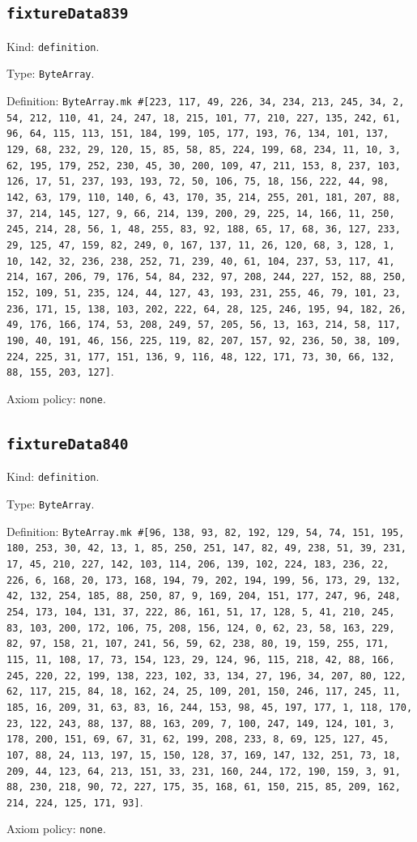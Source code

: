 \documentclass[11pt]{article}
\begin{document}
\subsection*{\texttt{fixtureData839}}
\noindent Kind: \texttt{definition}.\par
\noindent Type: \texttt{ByteArray}.\par
\noindent Definition: \texttt{ByteArray.mk \#[223, 117, 49, 226, 34, 234, 213, 245, 34, 2, 54, 212, 110, 41, 24, 247, 18, 215, 101, 77, 210, 227, 135, 242, 61, 96, 64, 115, 113, 151, 184, 199, 105, 177, 193, 76, 134, 101, 137, 129, 68, 232, 29, 120, 15, 85, 58, 85, 224, 199, 68, 234, 11, 10, 3, 62, 195, 179, 252, 230, 45, 30, 200, 109, 47, 211, 153, 8, 237, 103, 126, 17, 51, 237, 193, 193, 72, 50, 106, 75, 18, 156, 222, 44, 98, 142, 63, 179, 110, 140, 6, 43, 170, 35, 214, 255, 201, 181, 207, 88, 37, 214, 145, 127, 9, 66, 214, 139, 200, 29, 225, 14, 166, 11, 250, 245, 214, 28, 56, 1, 48, 255, 83, 92, 188, 65, 17, 68, 36, 127, 233, 29, 125, 47, 159, 82, 249, 0, 167, 137, 11, 26, 120, 68, 3, 128, 1, 10, 142, 32, 236, 238, 252, 71, 239, 40, 61, 104, 237, 53, 117, 41, 214, 167, 206, 79, 176, 54, 84, 232, 97, 208, 244, 227, 152, 88, 250, 152, 109, 51, 235, 124, 44, 127, 43, 193, 231, 255, 46, 79, 101, 23, 236, 171, 15, 138, 103, 202, 222, 64, 28, 125, 246, 195, 94, 182, 26, 49, 176, 166, 174, 53, 208, 249, 57, 205, 56, 13, 163, 214, 58, 117, 190, 40, 191, 46, 156, 225, 119, 82, 207, 157, 92, 236, 50, 38, 109, 224, 225, 31, 177, 151, 136, 9, 116, 48, 122, 171, 73, 30, 66, 132, 88, 155, 203, 127]}.\par
\noindent Axiom policy: \texttt{none}.\par
\subsection*{\texttt{fixtureData840}}
\noindent Kind: \texttt{definition}.\par
\noindent Type: \texttt{ByteArray}.\par
\noindent Definition: \texttt{ByteArray.mk \#[96, 138, 93, 82, 192, 129, 54, 74, 151, 195, 180, 253, 30, 42, 13, 1, 85, 250, 251, 147, 82, 49, 238, 51, 39, 231, 17, 45, 210, 227, 142, 103, 114, 206, 139, 102, 224, 183, 236, 22, 226, 6, 168, 20, 173, 168, 194, 79, 202, 194, 199, 56, 173, 29, 132, 42, 132, 254, 185, 88, 250, 87, 9, 169, 204, 151, 177, 247, 96, 248, 254, 173, 104, 131, 37, 222, 86, 161, 51, 17, 128, 5, 41, 210, 245, 83, 103, 200, 172, 106, 75, 208, 156, 124, 0, 62, 23, 58, 163, 229, 82, 97, 158, 21, 107, 241, 56, 59, 62, 238, 80, 19, 159, 255, 171, 115, 11, 108, 17, 73, 154, 123, 29, 124, 96, 115, 218, 42, 88, 166, 245, 220, 22, 199, 138, 223, 102, 33, 134, 27, 196, 34, 207, 80, 122, 62, 117, 215, 84, 18, 162, 24, 25, 109, 201, 150, 246, 117, 245, 11, 185, 16, 209, 31, 63, 83, 16, 244, 153, 98, 45, 197, 177, 1, 118, 170, 23, 122, 243, 88, 137, 88, 163, 209, 7, 100, 247, 149, 124, 101, 3, 178, 200, 151, 69, 67, 31, 62, 199, 208, 233, 8, 69, 125, 127, 45, 107, 88, 24, 113, 197, 15, 150, 128, 37, 169, 147, 132, 251, 73, 18, 209, 44, 123, 64, 213, 151, 33, 231, 160, 244, 172, 190, 159, 3, 91, 88, 230, 218, 90, 72, 227, 175, 35, 168, 61, 150, 215, 85, 209, 162, 214, 224, 125, 171, 93]}.\par
\noindent Axiom policy: \texttt{none}.\par
\end{document}
